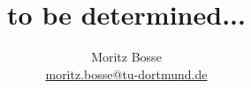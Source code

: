 

\author{Moritz Bosse\\
\texorpdfstring{\href{mailto:moritz.bosse@tu-dortmund.de}{moritz.bosse@tu-dortmund.de}}{}}
\subject{Quantum Field Theory}
\title{to be determined...}
\date{
}

\publishers{TU Dortmund – Fakultät Physik}


 
\maketitle
\tableofcontents

\ignorespacesafterend
\newpage
   

%
%

%
%
%
%
%
\newpage

\printbibliography




